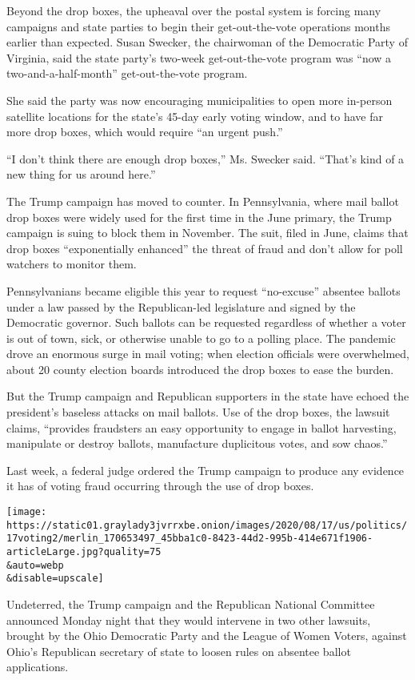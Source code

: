 Beyond the drop boxes, the upheaval over the postal system is forcing
many campaigns and state parties to begin their get-out-the-vote
operations months earlier than expected. Susan Swecker, the chairwoman
of the Democratic Party of Virginia, said the state party's two-week
get-out-the-vote program was ``now a two-and-a-half-month''
get-out-the-vote program.

She said the party was now encouraging municipalities to open more
in-person satellite locations for the state's 45-day early voting
window, and to have far more drop boxes, which would require ``an urgent
push.''

``I don't think there are enough drop boxes,'' Ms. Swecker said.
``That's kind of a new thing for us around here.''

The Trump campaign has moved to counter. In Pennsylvania, where mail
ballot drop boxes were widely used for the first time in the June
primary, the Trump campaign is suing to block them in November. The
suit, filed in June, claims that drop boxes ``exponentially enhanced''
the threat of fraud and don't allow for poll watchers to monitor them.

Pennsylvanians became eligible this year to request ``no-excuse''
absentee ballots under a law passed by the Republican-led legislature
and signed by the Democratic governor. Such ballots can be requested
regardless of whether a voter is out of town, sick, or otherwise unable
to go to a polling place. The pandemic drove an enormous surge in mail
voting; when election officials were overwhelmed, about 20 county
election boards introduced the drop boxes to ease the burden.

But the Trump campaign and Republican supporters in the state have
echoed the president's baseless attacks on mail ballots. Use of the drop
boxes, the lawsuit claims, ``provides fraudsters an easy opportunity to
engage in ballot harvesting, manipulate or destroy ballots, manufacture
duplicitous votes, and sow chaos.''

Last week, a federal judge ordered the Trump campaign to produce any
evidence it has of voting fraud occurring through the use of drop boxes.

\texttt{[image: https://static01.graylady3jvrrxbe.onion/images/2020/08/17/us/politics/17voting2/merlin\_170653497\_45bba1c0-8423-44d2-995b-414e671f1906-articleLarge.jpg?quality=75\\\&auto=webp\\\&disable=upscale]}

Undeterred, the Trump campaign and the Republican National Committee
announced Monday night that they would intervene in two other lawsuits,
brought by the Ohio Democratic Party and the League of Women Voters,
against Ohio's Republican secretary of state to loosen rules on absentee
ballot applications.

